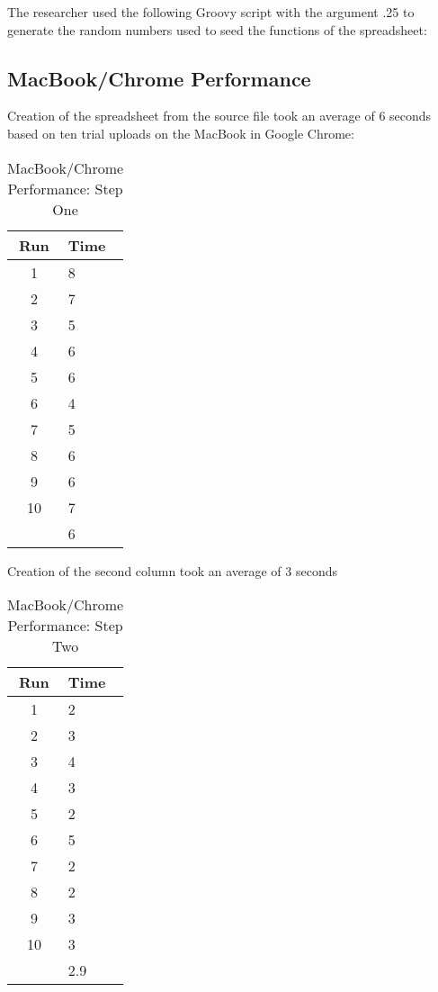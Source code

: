 The researcher used the following Groovy script with the argument .25 to
generate the random numbers used to seed the functions of the spreadsheet:



\subsection{MacBook/Chrome Performance}

Creation of the spreadsheet from the source file took an average of 6 seconds
based on ten trial uploads on the MacBook in Google Chrome:

\begin{table}
  \begin{tabular}{| c | l |}
    \hline
    Run  & Time \\ \hline
    1    & 8    \\ \hline
    2    & 7    \\ \hline
    3    & 5    \\ \hline
    4    & 6    \\ \hline
    5    & 6    \\ \hline
    6    & 4    \\ \hline
    7    & 5    \\ \hline
    8    & 6    \\ \hline
    9    & 6    \\ \hline
    10   & 7    \\ \hline
    & 6    \\
    \hline
  \end{tabular}
  \caption{MacBook/Chrome Performance: Step One}
  \label{mbChromePerf01}
\end{table}

Creation of the second column took an average of 3 seconds

\begin{table}
  \begin{tabular}{| c | l |}
    \hline
    Run  & Time \\ \hline
    1    & 2    \\ \hline
    2    & 3    \\ \hline
    3    & 4    \\ \hline
    4    & 3    \\ \hline
    5    & 2    \\ \hline
    6    & 5    \\ \hline
    7    & 2    \\ \hline
    8    & 2    \\ \hline
    9    & 3    \\ \hline
    10   & 3    \\ \hline
    & 2.9  \\
    \hline
  \end{tabular}
  \caption{MacBook/Chrome Performance: Step Two}
  \label{mbChromePerf02}
\end{table}

